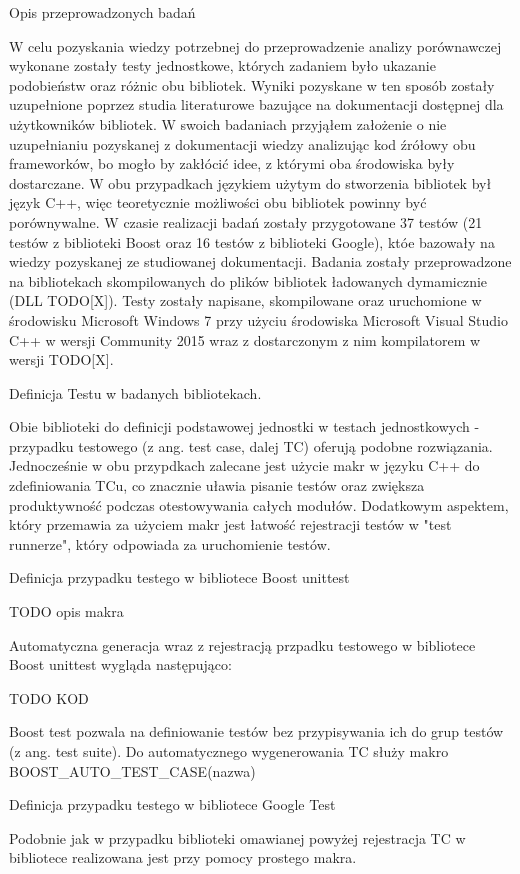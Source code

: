 Opis przeprowadzonych badań

W celu pozyskania wiedzy potrzebnej do przeprowadzenie analizy porównawczej wykonane zostały testy jednostkowe, których zadaniem było ukazanie podobieństw oraz różnic obu bibliotek. Wyniki pozyskane w ten sposób zostały uzupełnione poprzez studia literaturowe bazujące na dokumentacji dostępnej dla użytkowników bibliotek.
W swoich badaniach przyjąłem założenie o nie uzupełnianiu pozyskanej z dokumentacji wiedzy analizując kod źrółowy obu frameworków, bo mogło by zakłócić idee, z którymi oba środowiska były dostarczane. W obu przypadkach językiem użytym do stworzenia bibliotek był język C++, więc teoretycznie możliwości obu bibliotek powinny być porównywalne.
W czasie realizacji badań zostały przygotowane 37 testów (21 testów z biblioteki Boost oraz 16 testów z biblioteki Google), któe bazowały na wiedzy pozyskanej ze studiowanej dokumentacji.
Badania zostały przeprowadzone na bibliotekach skompilowanych do plików bibliotek ładowanych dymamicznie (DLL TODO[X]). Testy zostały napisane, skompilowane oraz uruchomione w środowisku Microsoft Windows 7 przy użyciu środowiska Microsoft Visual Studio C++ w wersji Community 2015 wraz z dostarczonym z nim kompilatorem w wersji TODO[X].

Definicja Testu w badanych bibliotekach.

Obie biblioteki do definicji podstawowej jednostki w testach jednostkowych - przypadku testowego (z ang. test case, dalej TC) oferują podobne rozwiązania. Jednocześnie w obu przypdkach zalecane jest użycie makr w języku C++ do zdefiniowania TCu, co znacznie uławia pisanie testów oraz zwiększa produktywność podczas otestowywania całych modułów.
Dodatkowym aspektem, który przemawia za użyciem makr jest łatwość rejestracji testów w "test runnerze", który odpowiada za uruchomienie testów.

Definicja przypadku testego w bibliotece Boost unittest

TODO opis makra

Automatyczna generacja wraz z rejestracją przpadku testowego w bibliotece Boost unittest wygląda następująco:

TODO KOD

Boost test pozwala na definiowanie testów bez przypisywania ich do grup testów (z ang. test suite). Do automatycznego wygenerowania TC służy makro BOOST_AUTO_TEST_CASE(nazwa){}

Definicja przypadku testego w bibliotece Google Test

Podobnie jak w przypadku biblioteki omawianej powyżej rejestracja TC w bibliotece realizowana jest przy pomocy prostego makra. 

